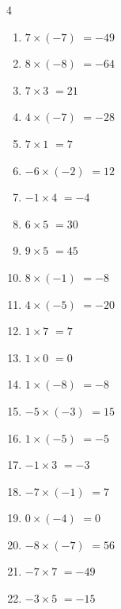 \begin{multicols}{4}
\begin{enumerate}
  \item $7\times (-7)$
        $=-49$

  \item $8\times (-8)$
        $=-64$

  \item $7\times 3$
        $=21$

  \item $4\times (-7)$
        $=-28$

  \item $7\times 1$
        $=7$

\columnbreak %

  \item $-6\times (-2)$
        $=12$

  \item $-1\times 4$
        $=-4$

  \item $6\times 5$
        $=30$

  \item $9\times 5$
        $=45$

  \item $8\times (-1)$
        $=-8$

  \item $4\times (-5)$
        $=-20$

  \item $1\times 7$
        $=7$

  \item $1\times 0$
        $=0$

  \item $1\times (-8)$
        $=-8$

  \item $-5\times (-3)$
        $=15$

  \item $1\times (-5)$
        $=-5$

  \item $-1\times 3$
        $=-3$

  \item $-7\times (-1)$
        $=7$

  \item $0\times (-4)$
        $=0$

  \item $-8\times (-7)$
        $=56$

  \item $-7\times 7$
        $=-49$

  \item $-3\times 5$
        $=-15$


\end{enumerate}
\end{multicols}
